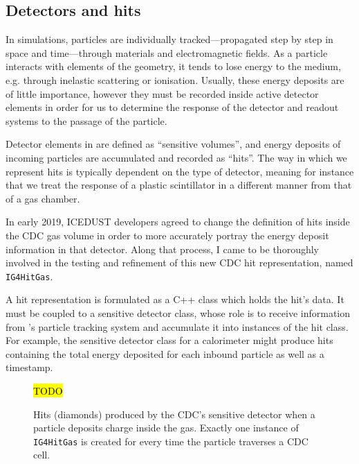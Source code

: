 \subsection{Detectors and hits}\label{subsec:SD}
In \Geant simulations, particles are individually tracked---propagated step by step in space and time---through materials and electromagnetic fields. 
As a particle interacts with elements of the geometry, it tends to lose energy to the medium, e.g. through inelastic scattering or ionisation. 
Usually, these energy deposits are of little importance, however they must be recorded inside active detector elements in order for us to determine the response of the detector and readout systems to the passage of the particle.


Detector elements in \Geant are defined as ``sensitive volumes'', and energy deposits of incoming particles are accumulated and recorded as ``hits''. 
The way in which we represent hits is typically dependent on the type of detector, meaning for instance that we treat the response of a plastic scintillator in a different manner from that of a gas chamber. %

In early 2019, ICEDUST developers agreed to change the definition of hits inside the CDC gas volume in order to more accurately portray the energy deposit information in that detector. Along that process, I came to be thoroughly involved in the testing and refinement of this new CDC hit representation, named \texttt{IG4HitGas}. 

A hit representation is formulated as a C++ class which holds the hit's data. It must be coupled to a sensitive detector class, whose role is to receive information from \Geant's particle tracking system and accumulate it into instances of the hit class. For example, the sensitive detector class for a calorimeter might produce hits containing the total energy deposited for each inbound particle as well as a timestamp.

\begin{figure}
    \centering
    \hl{TODO}
    \caption{Hits (diamonds) produced by the CDC's sensitive detector when a particle deposits charge inside the gas. Exactly one instance of \texttt{IG4HitGas} is created for every time the particle traverses a CDC cell.}
    \label{fig:sim_cdc_hits}
\end{figure}

